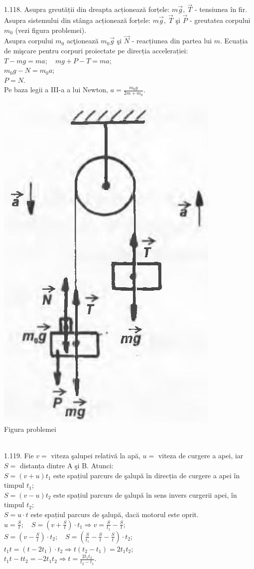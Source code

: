1.118. Asupra greutății din dreapta acționează forțele: $m \vec{g},\ \vec{T}$ - tensiunea în fir. Asupra sistemului din stânga acționează forțele: $m \vec{g},\ \vec{T}$ şi $\vec{P}$ - greutatea corpului $m_{0}$ (vezi figura problemei).\\ Asupra corpului $m_{0}$ acţionează $m_{0} \vec{g}$ şi $\vec{N}$ - reacțiunea din partea lui $m$. Ecuația de mişcare pentru corpuri proiectate pe direcția accelerației:\\ $T-m g=m a; \quad m g+P-T=m a$;\\ $m_{0} g-N=m_{0} a$;\\ $P=N$.\\ Pe baza legii a III-a a lui Newton, $a=\frac{m_{0} g}{2 m+m_{0}}$.\\ \begin{center} \includegraphics[width=0.4\linewidth]{images/2025_07_01_5b3ff9fa0d508c8e9f17g-222}\\ Figura problemei \end{center}\\

1.119. Fie $v=$ viteza şalupei relativă la apă, $u=$ viteza de curgere a apei, iar $S=$ distanța dintre A şi B. Atunci:\\ $S=(v+u) t_{1}$ este spațiul parcurs de şalupă în direcția de curgere a apei în timpul $t_{1}$;\\ $S=(v-u) t_{2}$ este spațiul parcurs de şalupă în sens invers curgerii apei, în timpul $t_{2}$;\\ $S=u \cdot t$ este spațiul parcurs de şalupă, dacă motorul este oprit.\\ $u=\frac{S}{t}; \quad S=\left(v+\frac{S}{t}\right) \cdot t_{1} \Rightarrow v=\frac{S}{t_{1}}-\frac{S}{t}$;\\ $S=\left(v-\frac{S}{t}\right) \cdot t_{2}; \quad S=\left(\frac{S}{t_{1}}-\frac{S}{t}-\frac{S}{t}\right) \cdot t_{2}$;\\ $t_{1} t=\left(t-2 t_{1}\right) \cdot t_{2} \Rightarrow t\left(t_{2}-t_{1}\right)=2 t_{1} t_{2}$;\\ $t_{1} t-t t_{2}=-2 t_{1} t_{2} \Rightarrow t=\frac{2 t_{1} t_{2}}{t_{2}-t_{1}}$.\\

